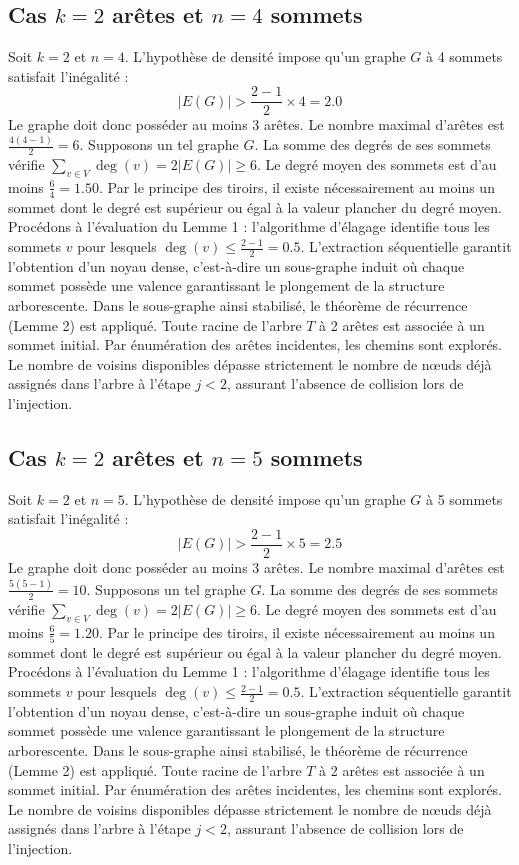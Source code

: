 \documentclass[12pt,a4paper]{article}
\begin{document}
\subsection{Cas $k = 2$ arêtes et $n = 4$ sommets}
Soit $k = 2$ et $n = 4$. L'hypothèse de densité impose qu'un graphe $G$ à 4 sommets satisfait l'inégalité :
$$ |E(G)| > \frac{2-1}{2} \times 4 = 2.0 $$
Le graphe doit donc posséder au moins $3$ arêtes. Le nombre maximal d'arêtes est $\frac{4(4-1)}{2} = 6$.
Supposons un tel graphe $G$. La somme des degrés de ses sommets vérifie $\sum_{v \in V} \deg(v) = 2|E(G)| \geq 6$.
Le degré moyen des sommets est d'au moins $\frac{6}{4} = 1.50$.
Par le principe des tiroirs, il existe nécessairement au moins un sommet dont le degré est supérieur ou égal à la valeur plancher du degré moyen.
Procédons à l'évaluation du Lemme 1 : l'algorithme d'élagage identifie tous les sommets $v$ pour lesquels $\deg(v) \leq \frac{2-1}{2} = 0.5$.
L'extraction séquentielle garantit l'obtention d'un noyau dense, c'est-à-dire un sous-graphe induit où chaque sommet possède une valence garantissant le plongement de la structure arborescente.
Dans le sous-graphe ainsi stabilisé, le théorème de récurrence (Lemme 2) est appliqué. Toute racine de l'arbre $T$ à 2 arêtes est associée à un sommet initial. Par énumération des arêtes incidentes, les chemins sont explorés. Le nombre de voisins disponibles dépasse strictement le nombre de nœuds déjà assignés dans l'arbre à l'étape $j < 2$, assurant l'absence de collision lors de l'injection.

\subsection{Cas $k = 2$ arêtes et $n = 5$ sommets}
Soit $k = 2$ et $n = 5$. L'hypothèse de densité impose qu'un graphe $G$ à 5 sommets satisfait l'inégalité :
$$ |E(G)| > \frac{2-1}{2} \times 5 = 2.5 $$
Le graphe doit donc posséder au moins $3$ arêtes. Le nombre maximal d'arêtes est $\frac{5(5-1)}{2} = 10$.
Supposons un tel graphe $G$. La somme des degrés de ses sommets vérifie $\sum_{v \in V} \deg(v) = 2|E(G)| \geq 6$.
Le degré moyen des sommets est d'au moins $\frac{6}{5} = 1.20$.
Par le principe des tiroirs, il existe nécessairement au moins un sommet dont le degré est supérieur ou égal à la valeur plancher du degré moyen.
Procédons à l'évaluation du Lemme 1 : l'algorithme d'élagage identifie tous les sommets $v$ pour lesquels $\deg(v) \leq \frac{2-1}{2} = 0.5$.
L'extraction séquentielle garantit l'obtention d'un noyau dense, c'est-à-dire un sous-graphe induit où chaque sommet possède une valence garantissant le plongement de la structure arborescente.
Dans le sous-graphe ainsi stabilisé, le théorème de récurrence (Lemme 2) est appliqué. Toute racine de l'arbre $T$ à 2 arêtes est associée à un sommet initial. Par énumération des arêtes incidentes, les chemins sont explorés. Le nombre de voisins disponibles dépasse strictement le nombre de nœuds déjà assignés dans l'arbre à l'étape $j < 2$, assurant l'absence de collision lors de l'injection.
\end{document}
